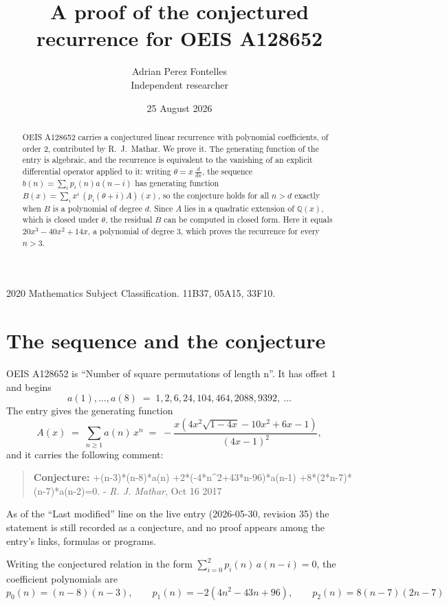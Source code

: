 \documentclass[11pt,a4paper]{article}
\title{A proof of the conjectured recurrence for OEIS A128652}
\author{Adrian Perez Fontelles\\ \small Independent researcher}
\date{25 August 2026}
\theoremstyle{plain}
\theoremstyle{definition}
\begin{document}
\maketitle

\begin{abstract}
OEIS A128652 carries a conjectured linear recurrence with polynomial coefficients, of
order 2, contributed by R.~J.~Mathar. We prove it. The generating function of the
entry is algebraic, and the recurrence is equivalent to the vanishing of an explicit
differential operator applied to it: writing $\theta=x\,\frac{d}{dx}$, the sequence
$b(n)=\sum_{i}p_{i}(n)a(n-i)$ has generating function
$B(x)=\sum_{i}x^{i}\,(p_{i}(\theta+i)A)(x)$, so the conjecture holds for all $n>d$ exactly
when $B$ is a polynomial of degree $d$. Since $A$ lies in a quadratic extension of
$\mathbb{Q}(x)$, which is closed under $\theta$, the residual $B$ can be computed in
closed form. Here it equals $20 x^{3} - 40 x^{2} + 14 x$, a polynomial of degree $3$, which proves
the recurrence for every $n>3$.
\end{abstract}

\noindent\small 2020 Mathematics Subject Classification. 11B37, 05A15, 33F10.\normalsize

\section{The sequence and the conjecture}

OEIS A128652 is ``Number of square permutations of length n''. It has offset $1$ and begins
\[
a(1),\dots,a(8)\;=\;1, 2, 6, 24, 104, 464, 2088, 9392,\ \dots
\]
The entry gives the generating function
\begin{equation}\label{eq:gf}
A(x)\;=\;\sum_{n\ge 1} a(n)\,x^{n}\;=\;- \frac{x \left(4 x^{2} \sqrt{1 - 4 x} - 10 x^{2} + 6 x - 1\right)}{\left(4 x - 1\right)^{2}} ,
\end{equation}
and it carries the following comment:
\begin{quote}\small
\textbf{Conjecture:} +(n-3)*(n-8)*a(n) +2*(-4*n\^{}2+43*n-96)*a(n-1) +8*(2*n-7)*(n-7)*a(n-2)=0. - \emph{R. J. Mathar}, Oct 16 2017
\end{quote}
As of the ``Last modified'' line on the live entry (2026-05-30, revision 35) the
statement is still recorded as a conjecture, and no proof appears among the entry's links,
formulas or programs.

Writing the conjectured relation in the form $\sum_{i=0}^{2}p_{i}(n)\,a(n-i)=0$,
the coefficient polynomials are
\[
p_{0}(n)=\left(n - 8\right) \left(n - 3\right),\qquad p_{1}(n)=- 2 \left(4 n^{2} - 43 n + 96\right),\qquad p_{2}(n)=8 \left(n - 7\right) \left(2 n - 7\right)
\]
\end{document}
